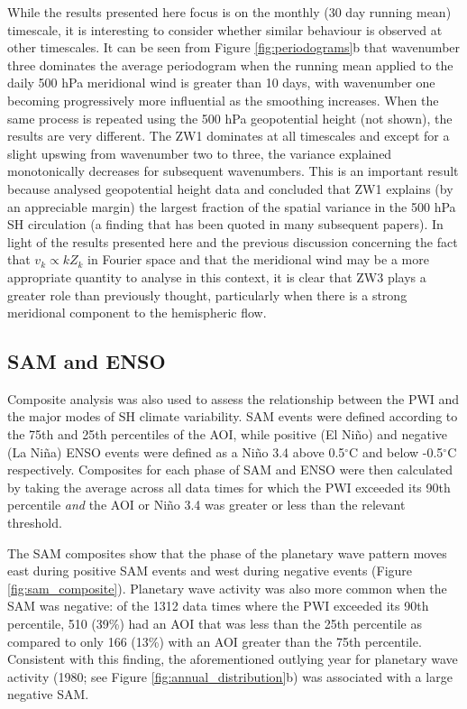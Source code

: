 While the results presented here focus is on the monthly (30 day running mean) timescale, it is interesting to consider whether similar behaviour is observed at other timescales. It can be seen from Figure \ref{fig:periodograms}b that wavenumber three dominates the average periodogram when the running mean applied to the daily 500 hPa meridional wind is greater than 10 days, with wavenumber one becoming progressively more influential as the smoothing increases. When the same process is repeated using the 500 hPa geopotential height (not shown), the results are very different. The ZW1 dominates at all timescales and except for a slight upswing from wavenumber two to three, the variance explained monotonically decreases for subsequent wavenumbers. This is an important result because \citet{vanLoon1972} analysed geopotential height data and concluded that ZW1 explains (by an appreciable margin) the largest fraction of the spatial variance in the 500 hPa SH circulation (a finding that has been quoted in many subsequent papers). In light of the results presented here and the previous discussion concerning the fact that $v_k \propto k Z_k$ in Fourier space and that the meridional wind may be a more appropriate quantity to analyse in this context, it is clear that ZW3 plays a greater role than previously thought, particularly when there is a strong meridional component to the hemispheric flow. 

  
\subsection{SAM and ENSO}

Composite analysis was also used to assess the relationship between the PWI and the major modes of SH climate variability. SAM events were defined according to the 75th and 25th percentiles of the AOI, while positive (El Ni\~{n}o) and negative (La Ni\~{n}a) ENSO events were defined as a Ni\~{n}o 3.4 above 0.5$^{\circ}$C and below -0.5$^{\circ}$C respectively. Composites for each phase of SAM and ENSO were then calculated by taking the average across all data times for which the PWI exceeded its 90th percentile \textit{and} the AOI or Ni\~{n}o 3.4 was greater or less than the relevant threshold. 

The SAM composites show that the phase of the planetary wave pattern moves east during positive SAM events and west during negative events (Figure \ref{fig:sam_composite}). Planetary wave activity was also more common when the SAM was negative: of the 1312 data times where the PWI exceeded its 90th percentile, 510 (39\%) had an AOI that was less than the 25th percentile as compared to only 166 (13\%) with an AOI greater than the 75th percentile. Consistent with this finding, the aforementioned outlying year for planetary wave activity (1980; see Figure \ref{fig:annual_distribution}b) was associated with a large negative SAM.

